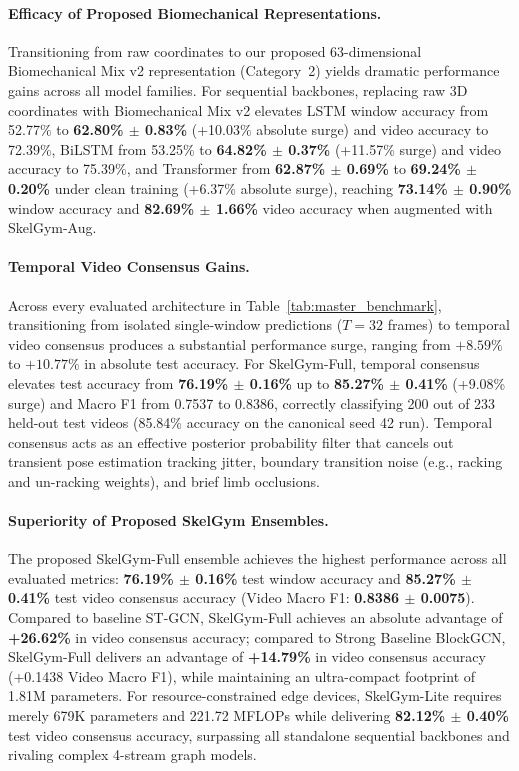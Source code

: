 \documentclass[preprint,12pt]{elsarticle}
\begin{document}
\paragraph{Efficacy of Proposed Biomechanical Representations.}
Transitioning from raw coordinates to our proposed 63-dimensional Biomechanical Mix v2 representation (Category~2) yields dramatic performance gains across all model families. For sequential backbones, replacing raw 3D coordinates with Biomechanical Mix v2 elevates LSTM window accuracy from 52.77\% to \textbf{62.80\% $\pm$ 0.83\%} (+10.03\% absolute surge) and video accuracy to 72.39\%, BiLSTM from 53.25\% to \textbf{64.82\% $\pm$ 0.37\%} (+11.57\% surge) and video accuracy to 75.39\%, and Transformer from \textbf{62.87\% $\pm$ 0.69\%} to \textbf{69.24\% $\pm$ 0.20\%} under clean training (+6.37\% absolute surge), reaching \textbf{73.14\% $\pm$ 0.90\%} window accuracy and \textbf{82.69\% $\pm$ 1.66\%} video accuracy when augmented with SkelGym-Aug.

\paragraph{Temporal Video Consensus Gains.}
Across every evaluated architecture in Table~\ref{tab:master_benchmark}, transitioning from isolated single-window predictions ($T=32$ frames) to temporal video consensus produces a substantial performance surge, ranging from $+8.59\%$ to $+10.77\%$ in absolute test accuracy. For SkelGym-Full, temporal consensus elevates test accuracy from \textbf{76.19\% $\pm$ 0.16\%} up to \textbf{85.27\% $\pm$ 0.41\%} (+9.08\% surge) and Macro F1 from 0.7537 to 0.8386, correctly classifying 200 out of 233 held-out test videos (85.84\% accuracy on the canonical seed 42 run). Temporal consensus acts as an effective posterior probability filter that cancels out transient pose estimation tracking jitter, boundary transition noise (e.g., racking and un-racking weights), and brief limb occlusions.

\paragraph{Superiority of Proposed SkelGym Ensembles.}
The proposed SkelGym-Full ensemble achieves the highest performance across all evaluated metrics: \textbf{76.19\% $\pm$ 0.16\%} test window accuracy and \textbf{85.27\% $\pm$ 0.41\%} test video consensus accuracy (Video Macro F1: \textbf{0.8386 $\pm$ 0.0075}). Compared to baseline ST-GCN, SkelGym-Full achieves an absolute advantage of \textbf{+26.62\%} in video consensus accuracy; compared to Strong Baseline BlockGCN, SkelGym-Full delivers an advantage of \textbf{+14.79\%} in video consensus accuracy (+0.1438 Video Macro F1), while maintaining an ultra-compact footprint of 1.81M parameters. For resource-constrained edge devices, SkelGym-Lite requires merely 679K parameters and 221.72 MFLOPs while delivering \textbf{82.12\% $\pm$ 0.40\%} test video consensus accuracy, surpassing all standalone sequential backbones and rivaling complex 4-stream graph models.
\end{document}
